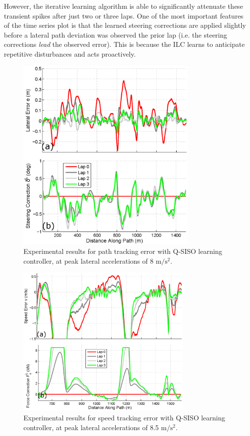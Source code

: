 \documentclass[9pt,shortpaper,twoside,web]{ieeecolor}
\begin{document}
However, the iterative learning algorithm is able to significantly attenuate these transient spikes after just two or three laps. One of the most important features of the time series plot is that the learned steering corrections are applied slightly before a lateral path deviation was observed the prior lap (i.e. the steering corrections \textit{lead} the observed error). This is because the ILC learns to anticipate repetitive disturbances and acts proactively.

\begin{figure}[h!]
\centering
\includegraphics[width=3.5in]{figures/expRes1.eps}
\caption{Experimental results for path tracking error with Q-SISO learning controller, at peak lateral accelerations of 8 $\mathrm{m/s^2}$.}
\label{fig:expRes1}
\end{figure}

\begin{figure}
\centering
\includegraphics[width=3.4in]{figures/expRes2.eps}
\caption{Experimental results for speed tracking error with Q-SISO learning controller, at peak lateral accelerations of 8.5 $\mathrm{m/s^2}$.}
\label{fig:expRes2}
\end{figure}
\end{document}
